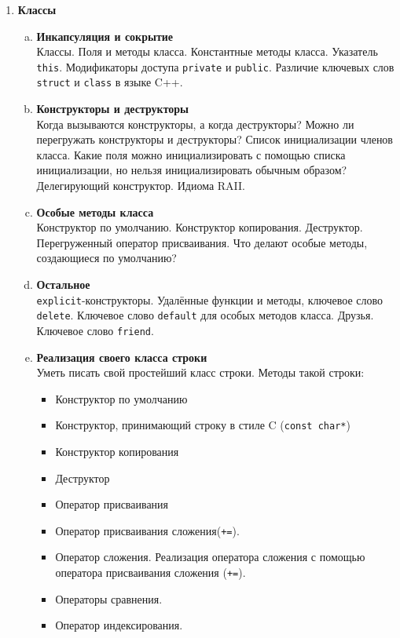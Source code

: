 \documentclass{article}
\begin{document}
\begin{enumerate}
\item \textbf{Классы}

\begin{enumerate}[a.]
\item \textbf{Инкапсуляция и сокрытие}\\
Классы. Поля и методы класса. Константные методы класса. Указатель \texttt{this}. Модификаторы доступа \texttt{private} и \texttt{public}. Различие ключевых слов \texttt{struct} и \texttt{class} в языке C++.

\item \textbf{Конструкторы и деструкторы}\\
Когда вызываются конструкторы, а когда деструкторы? Можно ли перегружать конструкторы и деструкторы? Список инициализации членов класса. Какие поля можно инициализировать с помощью списка инициализации, но нельзя инициализировать обычным образом? Делегирующий конструктор. Идиома RAII.

\item \textbf{Особые методы класса}\\
Конструктор по умолчанию. Конструктор копирования. Деструктор. Перегруженный оператор присваивания.
Что делают особые методы, создающиеся по умолчанию?

\item \textbf{Остальное}\\
\texttt{explicit}-конструкторы. Удалённые функции и методы, ключевое слово \texttt{delete}. Ключевое слово \texttt{default} для особых методов класса. Друзья. Ключевое слово \texttt{friend}.

\item \textbf{Реализация своего класса строки}\\
Уметь писать свой простейший класс строки.
Методы такой строки:
\begin{itemize}
\item Конструктор по умолчанию
\item Конструктор, принимающий строку в стиле C (\texttt{const char*})
\item Конструктор копирования
\item Деструктор
\item Оператор присваивания
\item Оператор присваивания сложения(\texttt{+=}). 
\item Оператор сложения. Реализация оператора сложения с помощью оператора присваивания сложения (\texttt{+=}).
\item Операторы сравнения.
\item Оператор индексирования.
\end{itemize}
\end{enumerate}






\end{enumerate}
\end{document}
